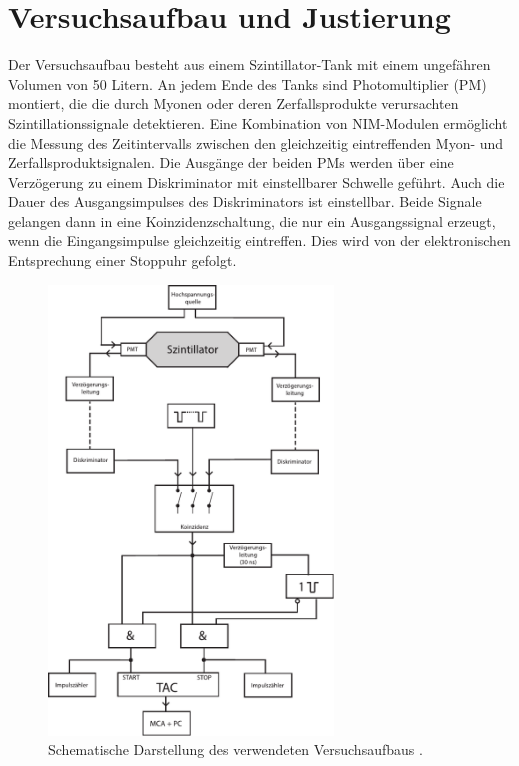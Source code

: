 \section{Versuchsaufbau und Justierung}

Der Versuchsaufbau besteht aus einem Szintillator-Tank mit einem ungefähren Volumen von 50 Litern. An jedem Ende des Tanks sind Photomultiplier (PM) montiert, die die durch Myonen oder deren Zerfallsprodukte verursachten Szintillationssignale detektieren. Eine Kombination von NIM-Modulen ermöglicht die Messung des Zeitintervalls zwischen den gleichzeitig eintreffenden Myon- und Zerfallsproduktsignalen. Die Ausgänge der beiden PMs werden über eine Verzögerung zu einem Diskriminator mit einstellbarer Schwelle geführt. Auch die Dauer des Ausgangsimpulses des Diskriminators ist einstellbar. Beide Signale gelangen dann in eine Koinzidenzschaltung, die nur ein Ausgangssignal erzeugt, wenn die Eingangsimpulse gleichzeitig eintreffen. Dies wird von der elektronischen Entsprechung einer Stoppuhr gefolgt.

\begin{figure}[H]
    \centering
    \includegraphics[width=0.675\textwidth]{content/grafik/Aufbau.pdf}
    \caption{Schematische Darstellung des verwendeten Versuchsaufbaus \cite{myon}.}
    \label{fig:Aufbau}
\end{figure}

